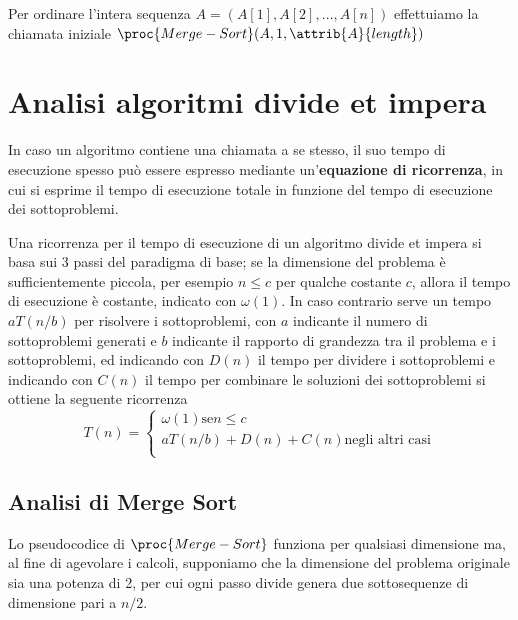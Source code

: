 Per ordinare l'intera sequenza $A = (A[1],A[2],\dots,A[n])$ effettuiamo la chiamata
iniziale $\proc{Merge-Sort}(A,1,\attrib{A}{length})$

\section{Analisi algoritmi divide et impera}
In caso un algoritmo contiene una chiamata a se stesso, il suo tempo di esecuzione
spesso può essere espresso mediante un'\textbf{equazione di ricorrenza}, in cui
si esprime il tempo di esecuzione totale in funzione del tempo di esecuzione dei sottoproblemi.

Una ricorrenza per il tempo di esecuzione di un algoritmo divide et impera si basa
sui 3 passi del paradigma di base; se la dimensione del problema è sufficientemente piccola,
per esempio $n \leq c$ per qualche costante $c$, allora il tempo di esecuzione è
costante, indicato con $\omega(1)$.
In caso contrario serve un tempo $aT(n/b)$ per risolvere i sottoproblemi, con $a$
indicante il numero di sottoproblemi generati e $b$ indicante il rapporto di grandezza
tra il problema e i sottoproblemi, ed indicando con $D(n)$ il tempo per dividere
i sottoproblemi e indicando con $C(n)$ il tempo per combinare le soluzioni dei
sottoproblemi si ottiene la seguente ricorrenza
\begin{equation*}
    T(n) = \begin{cases} \omega(1) \text{se} n \leq c \\
                         aT(n/b) + D(n) + C(n) \text{negli altri casi}\\
            \end{cases}
\end{equation*}

\subsection{Analisi di Merge Sort}
Lo pseudocodice di $\proc{Merge-Sort}$ funziona per qualsiasi dimensione ma, al fine
di agevolare i calcoli, supponiamo che la dimensione del problema originale sia una
potenza di 2, per cui ogni passo divide genera due sottosequenze di dimensione pari a $n/2$.

